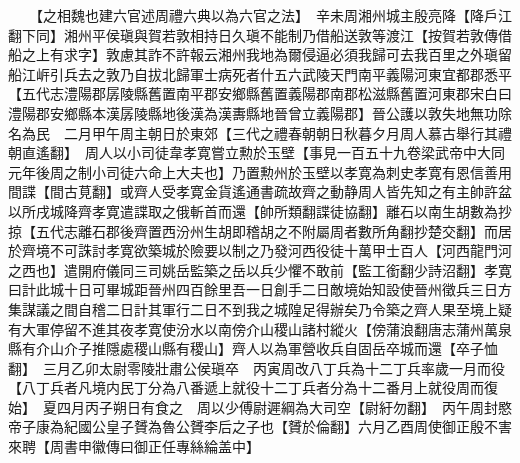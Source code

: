 　　【之相魏也建六官述周禮六典以為六官之法】　辛未周湘州城主殷亮降【降戶江翻下同】湘州平侯瑱與賀若敦相持日久瑱不能制乃借船送敦等渡江【按賀若敦傳借船之上有求字】敦慮其詐不許報云湘州我地為爾侵逼必須我歸可去我百里之外瑱留船江㟁引兵去之敦乃自拔北歸軍士病死者什五六武陵天門南平義陽河東宜都郡悉平【五代志澧陽郡孱陵縣舊置南平郡安鄉縣舊置義陽郡南郡松滋縣舊置河東郡宋白曰澧陽郡安鄉縣本漢孱陵縣地後漢為漢夀縣地晉曾立義陽郡】晉公護以敦失地無功除名為民　二月甲午周主朝日於東郊【三代之禮春朝朝日秋暮夕月周人慕古舉行其禮朝直遙翻】　周人以小司徒韋孝寛嘗立勲於玉壁【事見一百五十九卷梁武帝中大同元年後周之制小司徒六命上大夫也】乃置勲州於玉壁以孝寛為刺史孝寛有恩信善用間諜【間古莧翻】或齊人受孝寛金貨遙通書疏故齊之動静周人皆先知之有主帥許盆以所戌城降齊孝寛遣諜取之俄斬首而還【帥所類翻諜徒協翻】離石以南生胡數為抄掠【五代志離石郡後齊置西汾州生胡即稽胡之不附屬周者數所角翻抄楚交翻】而居於齊境不可誅討孝寛欲築城於險要以制之乃發河西役徒十萬甲士百人【河西龍門河之西也】遣開府儀同三司姚岳監築之岳以兵少懼不敢前【監工銜翻少詩沼翻】孝寛曰計此城十日可畢城距晉州四百餘里吾一日創手二日敵境始知設使晉州徵兵三日方集謀議之間自稽二日計其軍行二日不到我之城隍足得辦矣乃令築之齊人果至境上疑有大軍停留不進其夜孝寛使汾水以南傍介山稷山諸村縱火【傍蒲浪翻唐志蒲州萬泉縣有介山介子推隱處稷山縣有稷山】齊人以為軍營收兵自固岳卒城而還【卒子恤翻】　三月乙卯太尉零陵壯肅公侯瑱卒　丙寅周改八丁兵為十二丁兵率歲一月而役【八丁兵者凡境内民丁分為八番遞上就役十二丁兵者分為十二番月上就役周而復始】　夏四月丙子朔日有食之　周以少傅尉遲綱為大司空【尉紆勿翻】　丙午周封愍帝子康為紀國公皇子贇為魯公贇李后之子也【贇於倫翻】六月乙酉周使御正殷不害來聘【周書申徽傳曰御正任專絲綸盖中】

